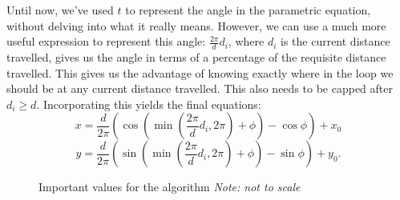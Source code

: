 \documentclass[twocolumn,12pt]{article}
\begin{document}
Until now, we've used $t$ to represent the angle in the parametric equation,
without delving into what it really means. However, we can use a much more
useful expression to represent this angle: $\frac{2\pi}{d}d_i$, where $d_i$ is
the current distance travelled, gives us the
angle in terms of a percentage of the requisite distance travelled. This gives
us the advantage of knowing exactly where in the loop we should be at any
current distance travelled. This also needs to be capped after $d_i \geq d$.
Incorporating this yields the final equations:
\[ x = \frac{d}{2\pi}(\cos (\min(\frac{2\pi}{d}d_i,2\pi) + \phi) - \cos \phi) + x_0 \]
\[ y = \frac{d}{2\pi}(\sin (\min(\frac{2\pi}{d}d_i,2\pi) + \phi) - \sin \phi)+ y_0. \]

\begin{figure}
  \centering
  \caption{Important values for the algorithm \emph{Note: not to scale}}
  \label{fig:algvals}
\end{figure}
\end{document}
